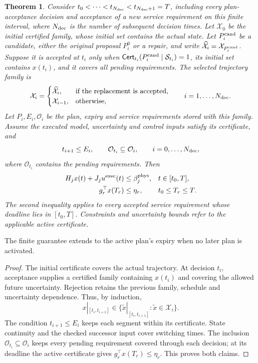 \documentclass[preprint,12pt]{elsarticle}
\theoremstyle{definition}
\theoremstyle{plain}
\newtheorem{theorem}{Theorem}
\theoremstyle{definition}
\theoremstyle{plain}
\begin{document}
\begin{theorem}
\label{thm:new-plan-closure}
Consider $t_0<\cdots<t_{N_{\rm dec}}<t_{N_{\rm dec}+1}=T$, including every plan-acceptance
decision and acceptance of a new service requirement on this finite
interval, where $N_{\rm dec}$ is the number of subsequent decision
times. Let $\mathcal X_0$ be the initial certified family, whose initial
set contains the actual state. Let $P_i^{\rm cand}$ be a candidate, either the original proposal
$P_i^0$ or a repair, and write
$\widehat{\mathcal X}_i=\mathcal X_{P_i^{\rm cand}}$. Suppose it is
accepted at $t_i$ only when
$\mathsf{Cert}_{t_i}(P_i^{\rm cand}\mid\mathcal S_{t_i})=1$, its
initial set contains $x(t_i)$, and it covers all pending requirements.
The selected trajectory family is
\begin{equation}
\mathcal X_i=\begin{cases}
\widehat{\mathcal X}_i,&\text{if the replacement is accepted},\\
\mathcal X_{i-1},&\text{otherwise},
\end{cases}\qquad i=1,\ldots,N_{\rm dec}.
\label{eq:execution-family-update}
\end{equation}
Let $P_i,E_i,\mathcal O_i$ be the plan, expiry and service requirements stored
with this family. Assume the executed model, uncertainty and control inputs
satisfy its certificate, and
\[
t_{i+1}\le E_i,\qquad \mathcal O_{t_i}\subseteq\mathcal O_i,
\qquad i=0,\ldots,N_{\rm dec},
\]
where $\mathcal O_{t_i}$ contains the pending requirements.
Then
\begin{equation}
\begin{aligned}
H_jx(t)+J_ju^{\rm exec}(t)&\le\beta_j^{\rm phys},
 &&t\in[t_0,T],\\
g_r^\top x(T_r)&\le\eta_r,
 &&t_0\le T_r\le T.
\end{aligned}
\label{eq:execution-physical-service}
\end{equation}
The second inequality applies to every accepted service requirement
whose deadline lies in $[t_0,T]$. Constraints and uncertainty bounds
refer to the applicable active certificate.
\end{theorem}
The finite guarantee extends to the active plan's expiry when no later
plan is activated.

\begin{proof}
The initial certificate covers the actual trajectory. At decision $t_i$,
acceptance supplies a certified family containing $x(t_i)$ and covering
the allowed future uncertainty. Rejection retains the previous family,
schedule and uncertainty dependence. Thus, by induction,
\[
x|_{[t_i,t_{i+1}]}\in
\{\widetilde x|_{[t_i,t_{i+1}]}:\widetilde x\in\mathcal X_i\}.
\]
The condition $t_{i+1}\le E_i$ keeps each segment within its certificate.
State continuity and the checked successor input cover switching times.
The inclusion $\mathcal O_{t_i}\subseteq\mathcal O_i$ keeps every pending
requirement covered through each decision; at its deadline the active
certificate gives $g_r^\top x(T_r)\le\eta_r$. This proves both claims.
\end{proof}
\end{document}
